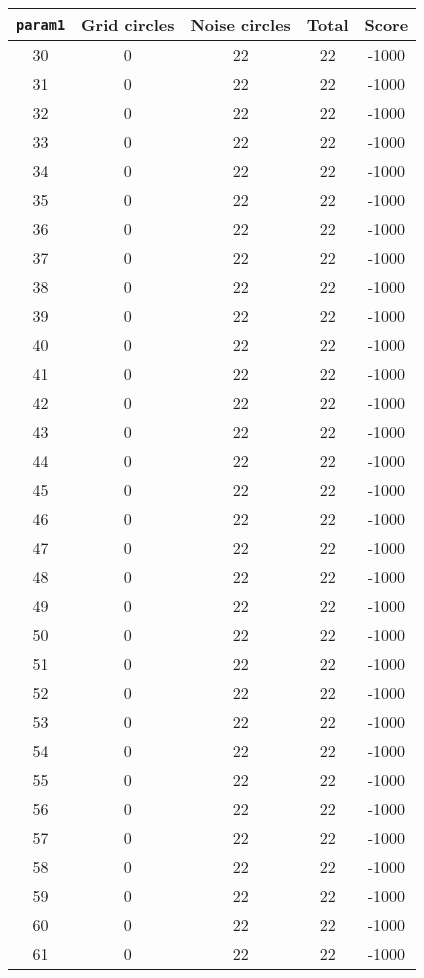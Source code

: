 \documentclass[letterpaper, 12pt]{article}
\begin{document}
\begin{longtable}{|c|c|c|c|c|}
\hline
\textbf{\texttt{param1}} & \textbf{Grid circles} & \textbf{Noise circles} & \textbf{Total} & \textbf{Score} \\
\hline
30 & 0 & 22 & 22 & -1000 \\
\hline
31 & 0 & 22 & 22 & -1000 \\
\hline
32 & 0 & 22 & 22 & -1000 \\
\hline
33 & 0 & 22 & 22 & -1000 \\
\hline
34 & 0 & 22 & 22 & -1000 \\
\hline
35 & 0 & 22 & 22 & -1000 \\
\hline
36 & 0 & 22 & 22 & -1000 \\
\hline
37 & 0 & 22 & 22 & -1000 \\
\hline
38 & 0 & 22 & 22 & -1000 \\
\hline
39 & 0 & 22 & 22 & -1000 \\
\hline
40 & 0 & 22 & 22 & -1000 \\
\hline
41 & 0 & 22 & 22 & -1000 \\
\hline
42 & 0 & 22 & 22 & -1000 \\
\hline
43 & 0 & 22 & 22 & -1000 \\
\hline
44 & 0 & 22 & 22 & -1000 \\
\hline
45 & 0 & 22 & 22 & -1000 \\
\hline
46 & 0 & 22 & 22 & -1000 \\
\hline
47 & 0 & 22 & 22 & -1000 \\
\hline
48 & 0 & 22 & 22 & -1000 \\
\hline
49 & 0 & 22 & 22 & -1000 \\
\hline
50 & 0 & 22 & 22 & -1000 \\
\hline
51 & 0 & 22 & 22 & -1000 \\
\hline
52 & 0 & 22 & 22 & -1000 \\
\hline
53 & 0 & 22 & 22 & -1000 \\
\hline
54 & 0 & 22 & 22 & -1000 \\
\hline
55 & 0 & 22 & 22 & -1000 \\
\hline
56 & 0 & 22 & 22 & -1000 \\
\hline
57 & 0 & 22 & 22 & -1000 \\
\hline
58 & 0 & 22 & 22 & -1000 \\
\hline
59 & 0 & 22 & 22 & -1000 \\
\hline
60 & 0 & 22 & 22 & -1000 \\
\hline
61 & 0 & 22 & 22 & -1000 \\

\end{longtable}
\end{document}
